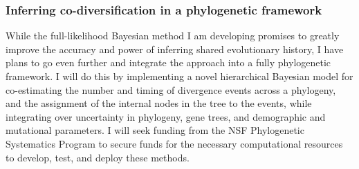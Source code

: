 \subsubsection*{Inferring co-diversification in a phylogenetic framework}
While the full-likelihood Bayesian method I am developing promises to
greatly improve the accuracy and power of inferring shared evolutionary
history, I have plans to go even further and integrate the approach into a
fully phylogenetic framework.
I will do this by implementing a novel hierarchical Bayesian model for
co-estimating the number and timing of divergence events across a phylogeny,
and the assignment of the internal nodes in the tree to the events, while
integrating over uncertainty in phylogeny, gene trees, and demographic and
mutational parameters.
I will seek funding from the NSF Phylogenetic Systematics Program to secure
funds for the necessary computational resources to develop, test, and deploy
these methods.


